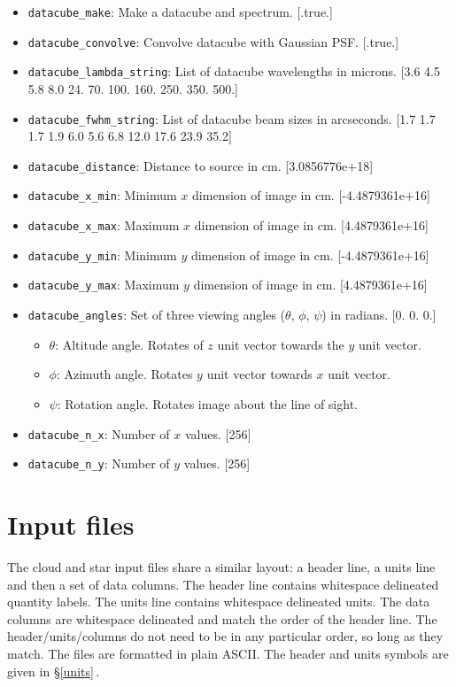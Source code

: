 \documentclass[11pt]{article}
\begin{document}
\begin{itemize}

	\item \texttt{datacube\_make}: Make a datacube and spectrum. [.true.]
	\item \texttt{datacube\_convolve}: Convolve datacube with Gaussian PSF. [.true.]
	\item \texttt{datacube\_lambda\_string}: List of datacube wavelengths in microns. [3.6 4.5 5.8 8.0 24. 70. 100. 160. 250. 350. 500.]
	\item \texttt{datacube\_fwhm\_string}: List of datacube beam sizes in arcseconds. [1.7 1.7 1.7 1.9 6.0 5.6 6.8 12.0 17.6 23.9 35.2]
	\item \texttt{datacube\_distance}: Distance to source in cm. [3.0856776e+18]
	\item \texttt{datacube\_x\_min}: Minimum $x$ dimension of image in cm. [-4.4879361e+16]
	\item \texttt{datacube\_x\_max}: Maximum $x$ dimension of image in cm. [4.4879361e+16]
	\item \texttt{datacube\_y\_min}: Minimum $y$ dimension of image in cm. [-4.4879361e+16]
	\item \texttt{datacube\_y\_max}: Maximum $y$ dimension of image in cm. [4.4879361e+16]
	\item \texttt{datacube\_angles}: Set of three viewing angles  ($\theta$, $\phi$, $\psi$) in radians. [0. 0. 0.]
		\begin{itemize}
			\item $\theta$: Altitude angle. Rotates of $z$ unit vector towards the $y$ unit vector.
			\item $\phi$: Azimuth angle. Rotates $y$ unit vector towards $x$ unit vector.
			\item $\psi$: Rotation angle. Rotates image about the line of sight.
		\end{itemize}
	\item \texttt{datacube\_n\_x}: Number of $x$ values. [256]
	\item \texttt{datacube\_n\_y}: Number of $y$ values. [256]

\end{itemize}

\section{Input files}

The cloud and star input files share a similar layout: a header line, a units line and then a set of data columns. The header line contains whitespace delineated quantity labels. The units line contains whitespace delineated units. The data columns are whitespace delineated and match the order of the header line. The header/units/columns do not need to be in any particular order, so long as they match. The files are formatted in plain ASCII. The header and units symbols are given in \S \ref{units}\,.
\end{document}
